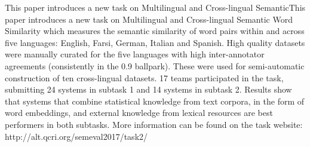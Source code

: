 This paper introduces a new task on Multilingual and Cross-lingual SemanticThis paper introduces a new task on Multilingual and Cross-lingual Semantic Word Similarity which measures the semantic similarity of word pairs within and across five languages: English, Farsi, German, Italian and Spanish. High quality datasets were manually curated for the five languages with high inter-annotator agreements (consistently in the 0.9 ballpark). These were used for semi-automatic construction of ten cross-lingual datasets. 17 teams participated in the task, submitting 24 systems in subtask 1 and 14 systems in subtask 2. Results show that systems that combine statistical knowledge from text corpora, in the form of word embeddings, and external knowledge from lexical resources are best performers in both subtasks. More information can be found on the task website: http://alt.qcri.org/semeval2017/task2/
